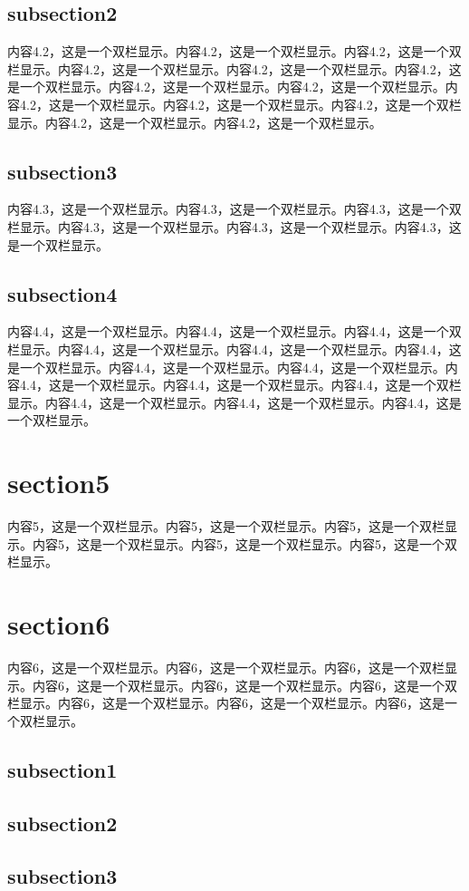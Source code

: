 \documentclass[a4pper]{article}
\begin{document}
\begin{multicols}{2}
    \subsection{subsection2}
    内容4.2，这是一个双栏显示。内容4.2，这是一个双栏显示。内容4.2，这是一个双栏显示。内容4.2，这是一个双栏显示。内容4.2，这是一个双栏显示。内容4.2，这是一个双栏显示。内容4.2，这是一个双栏显示。内容4.2，这是一个双栏显示。内容4.2，这是一个双栏显示。内容4.2，这是一个双栏显示。内容4.2，这是一个双栏显示。内容4.2，这是一个双栏显示。内容4.2，这是一个双栏显示。
    \subsection{subsection3}
    内容4.3，这是一个双栏显示。内容4.3，这是一个双栏显示。内容4.3，这是一个双栏显示。内容4.3，这是一个双栏显示。内容4.3，这是一个双栏显示。内容4.3，这是一个双栏显示。
    \subsection{subsection4}
    内容4.4，这是一个双栏显示。内容4.4，这是一个双栏显示。内容4.4，这是一个双栏显示。内容4.4，这是一个双栏显示。内容4.4，这是一个双栏显示。内容4.4，这是一个双栏显示。内容4.4，这是一个双栏显示。内容4.4，这是一个双栏显示。内容4.4，这是一个双栏显示。内容4.4，这是一个双栏显示。内容4.4，这是一个双栏显示。内容4.4，这是一个双栏显示。内容4.4，这是一个双栏显示。内容4.4，这是一个双栏显示。

\section{section5}
    内容5，这是一个双栏显示。内容5，这是一个双栏显示。内容5，这是一个双栏显示。内容5，这是一个双栏显示。内容5，这是一个双栏显示。内容5，这是一个双栏显示。

\section{section6}
    内容6，这是一个双栏显示。内容6，这是一个双栏显示。内容6，这是一个双栏显示。内容6，这是一个双栏显示。内容6，这是一个双栏显示。内容6，这是一个双栏显示。内容6，这是一个双栏显示。内容6，这是一个双栏显示。内容6，这是一个双栏显示。
    \subsection{subsection1}
    \subsection{subsection2}
    \subsection{subsection3}



\end{multicols}
\end{document}
